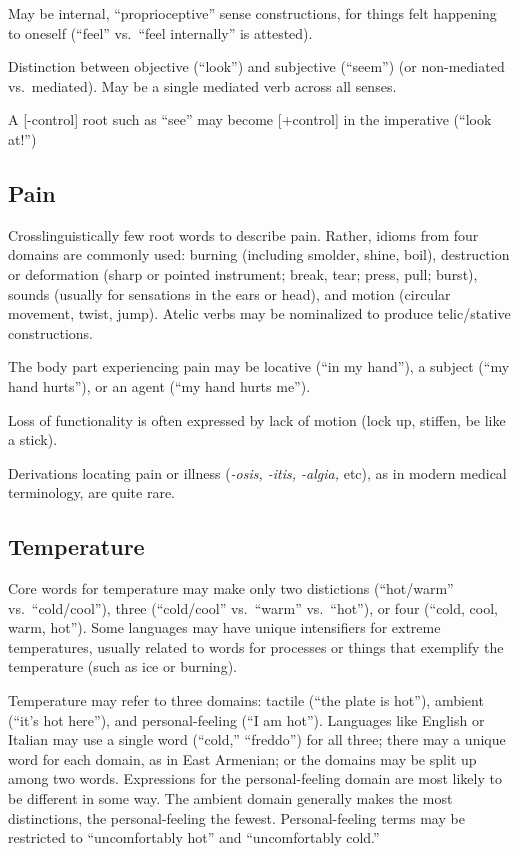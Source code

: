 \documentclass[11pt]{article}
\begin{document}
{May be internal, ``proprioceptive'' sense constructions, for things
felt happening to oneself (``feel'' vs.\ ``feel internally'' is
attested). 

Distinction between objective (``look'') and subjective (``seem'') (or
non-mediated vs.\ mediated).  May be a single mediated verb across all
senses.

A [-control] root such as ``see'' may become [+control] in the
imperative (``look at!'')


\subsection{Pain}
Crosslinguistically few root words to describe pain.  Rather, idioms
from four domains are commonly used: burning (including smolder,
shine, boil), destruction or deformation (sharp or pointed instrument;
break, tear; press, pull; burst), sounds (usually for sensations in
the ears or head), and motion (circular movement, twist, jump).
Atelic verbs may be nominalized to produce telic/stative
constructions.

The body part experiencing pain may be locative (``in my hand''), a
subject (``my hand hurts''), or an agent (``my hand hurts me'').

Loss of functionality is often expressed by lack of motion (lock up,
stiffen, be like a stick).

Derivations locating pain or illness (\textit{-osis, -itis, -algia,}
etc), as in modern medical terminology, are quite rare.

\subsection{Temperature}
Core words for temperature may make only two distictions (``hot/warm''
vs.\ ``cold/cool''), three (``cold/cool'' vs.\ ``warm'' vs.\ ``hot''),
or four (``cold, cool, warm, hot''). Some languages may have unique
intensifiers for extreme temperatures, usually related to words for
processes or things that exemplify the temperature (such as ice or
burning).

Temperature may refer to three domains: tactile (``the plate is
hot''), ambient (``it's hot here''), and personal-feeling (``I am
hot'').  Languages like English or Italian may use a single word
(``cold,'' ``freddo'') for all three; there may a unique word for each
domain, as in East Armenian; or the domains may be split up among two
words.  Expressions for the personal-feeling domain are most likely to
be different in some way.  The ambient domain generally makes the most
distinctions, the personal-feeling the fewest.  Personal-feeling terms
may be restricted to ``uncomfortably hot'' and ``uncomfortably cold.''

}
\end{document}
